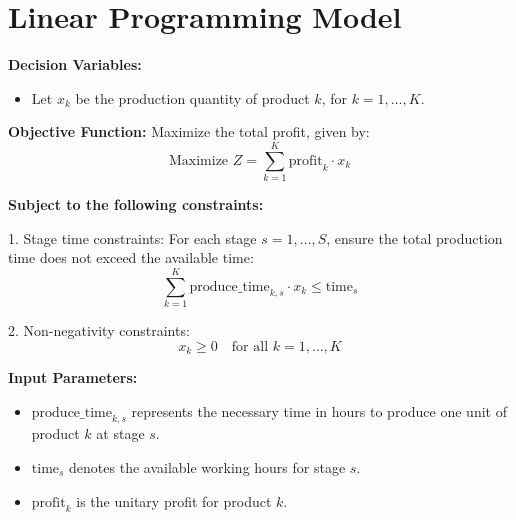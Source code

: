 \documentclass{article}
\begin{document}
\section*{Linear Programming Model}

\textbf{Decision Variables:}
\begin{itemize}
    \item Let \( x_k \) be the production quantity of product \( k \), for \( k = 1, \ldots, K \).
\end{itemize}

\textbf{Objective Function:}
Maximize the total profit, given by:
\[
\text{Maximize } Z = \sum_{k=1}^{K} \text{profit}_k \cdot x_k
\]

\textbf{Subject to the following constraints:}

1. Stage time constraints:
   For each stage \( s = 1, \ldots, S \), ensure the total production time does not exceed the available time:
   \[
   \sum_{k=1}^{K} \text{produce\_time}_{k, s} \cdot x_k \leq \text{time}_s
   \]

2. Non-negativity constraints:
   \[
   x_k \geq 0 \quad \text{for all } k = 1, \ldots, K
   \]

\textbf{Input Parameters:}
\begin{itemize}
    \item \(\text{produce\_time}_{k, s}\) represents the necessary time in hours to produce one unit of product \( k \) at stage \( s \).
    \item \(\text{time}_s\) denotes the available working hours for stage \( s \).
    \item \(\text{profit}_k\) is the unitary profit for product \( k \).
\end{itemize}
\end{document}
